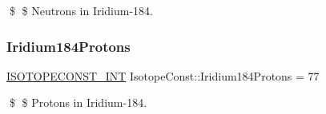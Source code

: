 \$ \$ Neutrons in Iridium-\/184. \mbox{\label{group___isotope_const-_iridium-_ir184_gad33938985aec6886cbcd508745c52bf6}} 
\subsubsection{\texorpdfstring{Iridium184\+Protons}{Iridium184Protons}}
{\footnotesize\ttfamily \mbox{\hyperlink{group___isotope_const-_macros_ga5f18360b3e99483a35c32d789e62621c}{I\+S\+O\+T\+O\+P\+E\+C\+O\+N\+S\+T\+\_\+\+I\+NT}} Isotope\+Const\+::\+Iridium184\+Protons = 77}

\$ \$ Protons in Iridium-\/184. 